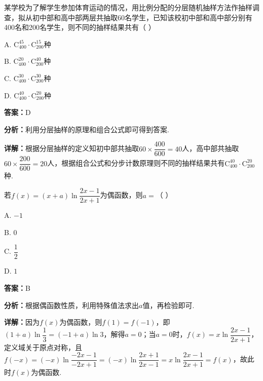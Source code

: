 \begin{question}[points=5]
某学校为了解学生参加体育运动的情况，用比例分配的分层随机抽样方法作抽样调查，拟从初中部和高中部两层共抽取60名学生，已知该校初中部和高中部分别有400名和200名学生，则不同的抽样结果共有（ \quad ）
\begin{choices}
  \item A. $\mathrm{C}_{400}^{45}\cdot\mathrm{C}_{200}^{15}$种
  \item B. $\mathrm{C}_{400}^{20}\cdot\mathrm{C}_{200}^{40}$种
  \item C. $\mathrm{C}_{400}^{30}\cdot\mathrm{C}_{200}^{30}$种
  \item D. $\mathrm{C}_{400}^{40}\cdot\mathrm{C}_{200}^{20}$种
\end{choices}
\begin{solution}
\textbf{答案：}D

\textbf{分析：}利用分层抽样的原理和组合公式即可得到答案.

\textbf{详解：}根据分层抽样的定义知初中部共抽取$60\times\dfrac{400}{600}=40$人，高中部共抽取$60\times\dfrac{200}{600}=20$人，根据组合公式和分步计数原理则不同的抽样结果共有$\mathrm{C}_{400}^{40}\cdot\mathrm{C}_{200}^{20}$种.
\end{solution}
\end{question}

\begin{question}[points=5]
若$f(x)=(x+a)\ln\dfrac{2x-1}{2x+1}$为偶函数，则$a=$（ \quad ）
\begin{choices}
  \item A. $-1$
  \item B. $0$
  \item C. $\dfrac{1}{2}$
  \item D. $1$
\end{choices}
\begin{solution}
\textbf{答案：}B

\textbf{分析：}根据偶函数性质，利用特殊值法求出$a$值，再检验即可.

\textbf{详解：}因为$f(x)$为偶函数，则$f(1)=f(-1)$，即$(1+a)\ln\dfrac{1}{3}=(-1+a)\ln3$，解得$a=0$；当$a=0$时，$f(x)=x\ln\dfrac{2x-1}{2x+1}$，定义域关于原点对称，且$f(-x)=(-x)\ln\dfrac{-2x-1}{-2x+1}=(-x)\ln\dfrac{2x+1}{2x-1}=x\ln\dfrac{2x-1}{2x+1}=f(x)$，故此时$f(x)$为偶函数.
\end{solution}
\end{question}

